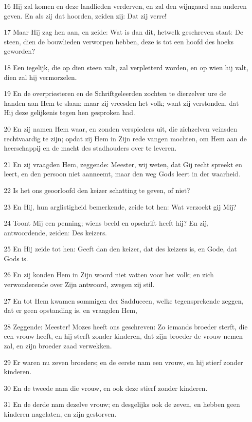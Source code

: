 \par 16 Hij zal komen en deze landlieden verderven, en zal den wijngaard aan anderen geven. En als zij dat hoorden, zeiden zij: Dat zij verre!
\par 17 Maar Hij zag hen aan, en zeide: Wat is dan dit, hetwelk geschreven staat: De steen, dien de bouwlieden verworpen hebben, deze is tot een hoofd des hoeks geworden?
\par 18 Een iegelijk, die op dien steen valt, zal verpletterd worden, en op wien hij valt, dien zal hij vermorzelen.
\par 19 En de overpriesteren en de Schriftgeleerden zochten te dierzelver ure de handen aan Hem te slaan; maar zij vreesden het volk; want zij verstonden, dat Hij deze gelijkenis tegen hen gesproken had.
\par 20 En zij namen Hem waar, en zonden verspieders uit, die zichzelven veinsden rechtvaardig te zijn; opdat zij Hem in Zijn rede vangen mochten, om Hem aan de heerschappij en de macht des stadhouders over te leveren.
\par 21 En zij vraagden Hem, zeggende: Meester, wij weten, dat Gij recht spreekt en leert, en den persoon niet aanneemt, maar den weg Gods leert in der waarheid.
\par 22 Is het ons geoorloofd den keizer schatting te geven, of niet?
\par 23 En Hij, hun arglistigheid bemerkende, zeide tot hen: Wat verzoekt gij Mij?
\par 24 Toont Mij een penning; wiens beeld en opschrift heeft hij? En zij, antwoordende, zeiden: Des keizers.
\par 25 En Hij zeide tot hen: Geeft dan den keizer, dat des keizers is, en Gode, dat Gods is.
\par 26 En zij konden Hem in Zijn woord niet vatten voor het volk; en zich verwonderende over Zijn antwoord, zwegen zij stil.
\par 27 En tot Hem kwamen sommigen der Sadduceen, welke tegensprekende zeggen, dat er geen opstanding is, en vraagden Hem,
\par 28 Zeggende: Meester! Mozes heeft ons geschreven: Zo iemands broeder sterft, die een vrouw heeft, en hij sterft zonder kinderen, dat zijn broeder de vrouw nemen zal, en zijn broeder zaad verwekken.
\par 29 Er waren nu zeven broeders; en de eerste nam een vrouw, en hij stierf zonder kinderen.
\par 30 En de tweede nam die vrouw, en ook deze stierf zonder kinderen.
\par 31 En de derde nam dezelve vrouw; en desgelijks ook de zeven, en hebben geen kinderen nagelaten, en zijn gestorven.
